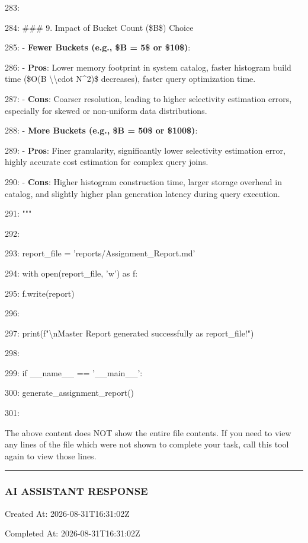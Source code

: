 \documentclass[11pt,a4paper]{article}
\begin{document}
283:

284: \#\#\# 9. Impact of Bucket Count (\$B\$) Choice

285: - \textbf{Fewer Buckets (e.g., \$B = 5\$ or \$10\$)}:

286:   - \textbf{Pros}: Lower memory footprint in system catalog, faster histogram build time (\$O(B \textbackslash{}\textbackslash{}cdot N\textasciicircum{}2)\$ decreases), faster query optimization time.

287:   - \textbf{Cons}: Coarser resolution, leading to higher selectivity estimation errors, especially for skewed or non-uniform data distributions.

288: - \textbf{More Buckets (e.g., \$B = 50\$ or \$100\$)}:

289:   - \textbf{Pros}: Finer granularity, significantly lower selectivity estimation error, highly accurate cost estimation for complex query joins.

290:   - \textbf{Cons}: Higher histogram construction time, larger storage overhead in catalog, and slightly higher plan generation latency during query execution.

291: """

292:

293:     report\_file = 'reports/Assignment\_Report.md'

294:     with open(report\_file, 'w') as f:

295:         f.write(report)

296:

297:     print(f"\textbackslash{}nMaster Report generated successfully as {report\_file}!")

298:

299: if \_\_name\_\_ == '\_\_main\_\_':

300:     generate\_assignment\_report()

301:

The above content does NOT show the entire file contents. If you need to view any lines of the file which were not shown to complete your task, call this tool again to view those lines.


\hrule

\subsubsection{AI ASSISTANT RESPONSE}

Created At: 2026-08-31T16:31:02Z

Completed At: 2026-08-31T16:31:02Z
\end{document}
